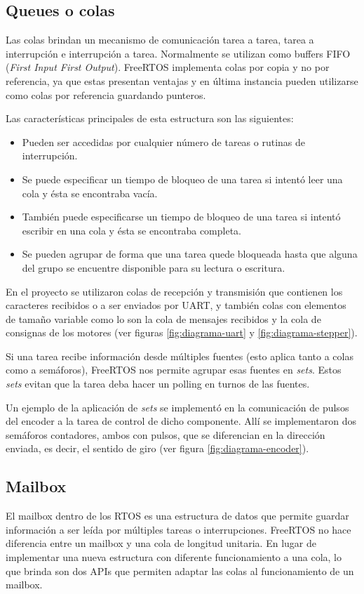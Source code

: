 \documentclass{IEEEtran}
\begin{document}
\subsection{Queues o colas}
Las colas brindan un mecanismo de comunicación tarea a tarea, tarea a interrupción e interrupción a tarea. Normalmente se utilizan como buffers FIFO (\textit{First Input First Output}). FreeRTOS implementa colas por copia y no por referencia, ya que estas presentan ventajas y en última instancia pueden utilizarse como colas por referencia guardando punteros.

Las características principales de esta estructura son las siguientes:

\begin{itemize}
    \item Pueden ser accedidas por cualquier número de tareas o rutinas de interrupción.
    \item Se puede especificar un tiempo de bloqueo de una tarea si intentó leer una cola y ésta se encontraba vacía.
    \item También puede especificarse un tiempo de bloqueo de una tarea si intentó escribir en una cola y ésta se encontraba completa.
    \item Se pueden agrupar de forma que una tarea quede bloqueada hasta que alguna del grupo se encuentre disponible para su lectura o escritura.
\end{itemize}

En el proyecto se utilizaron colas de recepción y transmisión que contienen los caracteres recibidos o a ser enviados por UART, y también colas con elementos de tamaño variable como lo son la cola de mensajes recibidos y la cola de consignas de los motores (ver figuras \ref{fig:diagrama-uart} y \ref{fig:diagrama-stepper}).

Si una tarea recibe información desde múltiples fuentes (esto aplica tanto a colas como a semáforos), FreeRTOS nos permite agrupar esas fuentes en \textit{sets}. Estos \textit{sets} evitan que la tarea deba hacer un polling en turnos de las fuentes.

Un ejemplo de la aplicación de \textit{sets} se implementó en la comunicación de pulsos del encoder a la tarea de control de dicho componente. Allí se implementaron dos semáforos contadores, ambos con pulsos, que se diferencian en la dirección enviada, es decir, el sentido de giro (ver figura \ref{fig:diagrama-encoder}).

\subsection{Mailbox}
El mailbox dentro de los RTOS es una estructura de datos que permite guardar información a ser leída por múltiples tareas o interrupciones. FreeRTOS no hace diferencia entre un mailbox y una cola de longitud unitaria. En lugar de implementar una nueva estructura con diferente funcionamiento a una cola, lo que brinda son dos APIs que permiten adaptar las colas al funcionamiento de un mailbox.
\end{document}
